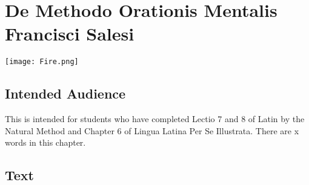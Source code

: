 \chapter{De Methodo Orationis Mentalis Francisci Salesi}
\begin{center}
\texttt{[image: Fire.png]}
\end{center}

\section{Intended Audience}
This is intended for students who have completed Lectio 7 and 8 of Latin by the Natural Method and Chapter 6 of Lingua Latina Per Se Illustrata. There are x words in this chapter.

\section{Text}